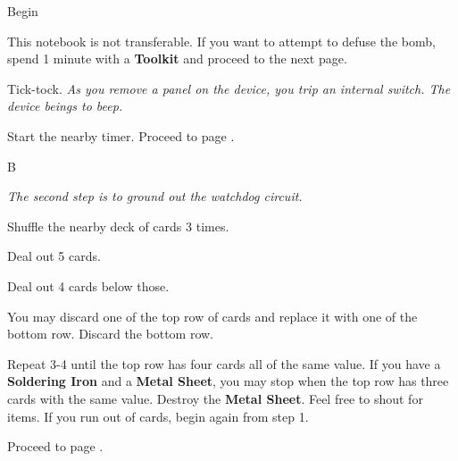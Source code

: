 \documentclass[notebook]{airship}
\begin{document}
\startnotebook{\nBomb{}}



\begin{page}{Begin}

This notebook is not transferable. If you want to attempt to defuse the bomb, spend 1 minute with a {\bf Toolkit} and proceed to the next page.
\end{page}



\begin{page}{Tick-tock.}
{\it As you remove a panel on the device, you trip an internal switch. The device beings to beep.}

Start the nearby timer. Proceed to page .

\end{page}



\begin{page}{B}

{\it The second step is to ground out the watchdog circuit.}

\begin{enum}
\item Shuffle the nearby deck of cards 3 times. 
\item Deal out 5 cards.
\item Deal out 4 cards below those.
\item You may discard one of the top row of cards and replace it with one of the bottom row. Discard the bottom row.
\item Repeat 3-4 until the top row has four cards all of the same value. If you have a {\bf Soldering Iron} and a {\bf Metal Sheet}, you may stop when the top row has three cards with the same value. Destroy the {\bf Metal Sheet}. Feel free to shout for items. If you run out of cards, begin again from step 1. 
\item Proceed to page .
\end{enum}

\end{page}
\end{document}
